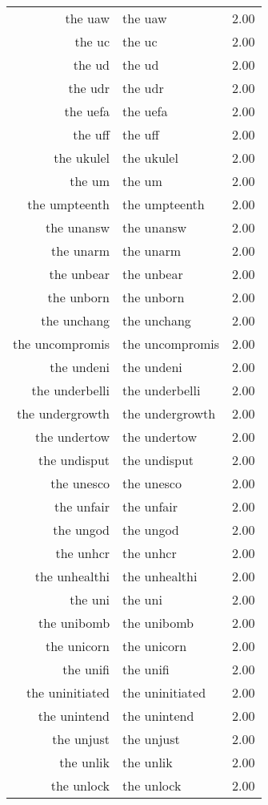 \begin{table}[ht]
\begin{tabular}{rlr}
  the uaw & the uaw & 2.00 \\ 
  the uc & the uc & 2.00 \\ 
  the ud & the ud & 2.00 \\ 
  the udr & the udr & 2.00 \\ 
  the uefa & the uefa & 2.00 \\ 
  the uff & the uff & 2.00 \\ 
  the ukulel & the ukulel & 2.00 \\ 
  the um & the um & 2.00 \\ 
  the umpteenth & the umpteenth & 2.00 \\ 
  the unansw & the unansw & 2.00 \\ 
  the unarm & the unarm & 2.00 \\ 
  the unbear & the unbear & 2.00 \\ 
  the unborn & the unborn & 2.00 \\ 
  the unchang & the unchang & 2.00 \\ 
  the uncompromis & the uncompromis & 2.00 \\ 
  the undeni & the undeni & 2.00 \\ 
  the underbelli & the underbelli & 2.00 \\ 
  the undergrowth & the undergrowth & 2.00 \\ 
  the undertow & the undertow & 2.00 \\ 
  the undisput & the undisput & 2.00 \\ 
  the unesco & the unesco & 2.00 \\ 
  the unfair & the unfair & 2.00 \\ 
  the ungod & the ungod & 2.00 \\ 
  the unhcr & the unhcr & 2.00 \\ 
  the unhealthi & the unhealthi & 2.00 \\ 
  the uni & the uni & 2.00 \\ 
  the unibomb & the unibomb & 2.00 \\ 
  the unicorn & the unicorn & 2.00 \\ 
  the unifi & the unifi & 2.00 \\ 
  the uninitiated & the uninitiated & 2.00 \\ 
  the unintend & the unintend & 2.00 \\ 
  the unjust & the unjust & 2.00 \\ 
  the unlik & the unlik & 2.00 \\ 
  the unlock & the unlock & 2.00 \\ 

\end{tabular}
\end{table}
